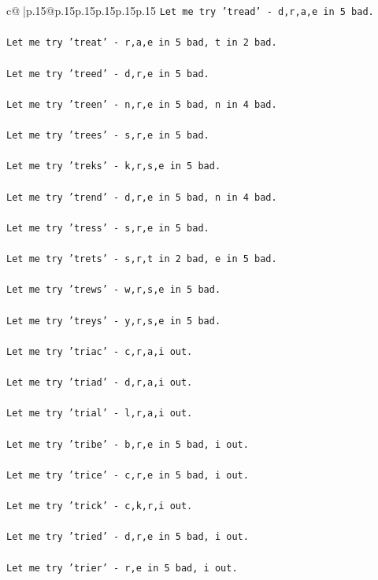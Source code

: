 \documentclass{article}
\begin{document}
{\begin{supertabular}{c@{$\;$}|p{.15\linewidth}@{}p{.15\linewidth}p{.15\linewidth}p{.15\linewidth}p{.15\linewidth}p{.15\linewidth}}
{{{\texttt{Let me try 'tread' {-} d,r,a,e in 5 bad. } \\
\\ 
\texttt{Let me try 'treat' {-} r,a,e in 5 bad, t in 2 bad. } \\
\\ 
\texttt{Let me try 'treed' {-} d,r,e in 5 bad. } \\
\\ 
\texttt{Let me try 'treen' {-} n,r,e in 5 bad, n in 4 bad. } \\
\\ 
\texttt{Let me try 'trees' {-} s,r,e in 5 bad. } \\
\\ 
\texttt{Let me try 'treks' {-} k,r,s,e in 5 bad. } \\
\\ 
\texttt{Let me try 'trend' {-} d,r,e in 5 bad, n in 4 bad. } \\
\\ 
\texttt{Let me try 'tress' {-} s,r,e in 5 bad. } \\
\\ 
\texttt{Let me try 'trets' {-} s,r,t in 2 bad, e in 5 bad. } \\
\\ 
\texttt{Let me try 'trews' {-} w,r,s,e in 5 bad. } \\
\\ 
\texttt{Let me try 'treys' {-} y,r,s,e in 5 bad. } \\
\\ 
\texttt{Let me try 'triac' {-} c,r,a,i out. } \\
\\ 
\texttt{Let me try 'triad' {-} d,r,a,i out. } \\
\\ 
\texttt{Let me try 'trial' {-} l,r,a,i out. } \\
\\ 
\texttt{Let me try 'tribe' {-} b,r,e in 5 bad, i out. } \\
\\ 
\texttt{Let me try 'trice' {-} c,r,e in 5 bad, i out. } \\
\\ 
\texttt{Let me try 'trick' {-} c,k,r,i out. } \\
\\ 
\texttt{Let me try 'tried' {-} d,r,e in 5 bad, i out. } \\
\\ 
\texttt{Let me try 'trier' {-} r,e in 5 bad, i out. } \\
}}}
\end{supertabular}}
\end{document}
